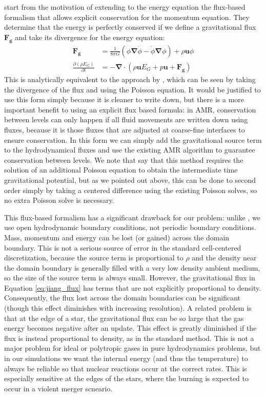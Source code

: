 \documentclass[12pt,preprint]{aastex}
\begin{document}
\citet{jiang:2013} start from the motivation of extending to the energy equation the flux-based formalism that allows explicit conservation for the momentum equation. They determine that the energy is perfectly conserved if we define a gravitational flux $\mathbf{F_g}$ and take its divergence for the energy equation:
\begin{align}
  \mathbf{F_g} &= \frac{1}{8\pi G}\left(\phi\bm{\nabla}\dot{\phi} - \dot{\phi}\bm{\nabla}\phi\right) + \rho\mathbf{u}\phi \label{eq:jiang_flux}\\
  \frac{\partial (\rho E_G)}{\partial t} &= -\bm{\nabla} \cdot \left(\rho\mathbf{u}E_G + p\mathbf{u} + \mathbf{F_g}\right)
\end{align}
This is analytically equivalent to the approach by \citet{marcello:2012}, which can be seen by taking the divergence of the flux and using the Poisson equation. It would be justified to use this form simply because it is cleaner to write down, but there is a more important benefit to using an explicit flux based formula: in AMR, conservation between levels can only happen if all fluid movements are written down using fluxes, because it is those fluxes that are adjusted at coarse-fine interfaces to ensure conservation. In this form we can simply add the gravitational source term to the hydrodynamical fluxes and use the existing AMR algorithm to guarantee conservation between levels. We note that \citeauthor{jiang:2013} say that this method requires the solution of an additional Poisson equation to obtain the intermediate time gravitational potential, but as we pointed out above, this can be done to second order simply by taking a centered difference using the existing Poisson solves, so no extra Poisson solve is necessary.

This flux-based formalism has a significant drawback for our problem: unlike \citeauthor{jiang:2013}, we use open hydrodynamic boundary conditions, not periodic boundary conditions. Mass, momentum and energy can be lost (or gained) across the domain boundary. This is not a serious source of error in the standard cell-centered discretization, because the source term is proportional to $\rho$ and the density near the domain boundary is generally filled with a very low density ambient medium, so the size of the source term is always small. However, the gravitational flux in Equation \ref{eq:jiang_flux} has terms that are not explicitly proportional to density. Consequently, the flux lost across the domain boundaries can be significant (though this effect diminishes with increasing resolution). A related problem is that at the edge of a star, the gravitational flux can be so large that the gas energy becomes negative after an update. This effect is greatly diminished if the flux is instead proportional to density, as in the standard method. This is not a major problem for ideal or polytropic gases in pure hydrodynamics problems, but in our simulations we want the internal energy (and thus the temperature) to always be reliable so that nuclear reactions occur at the correct rates. This is especially sensitive at the edges of the stars, where the burning is expected to occur in a violent merger scneario.
\end{document}
